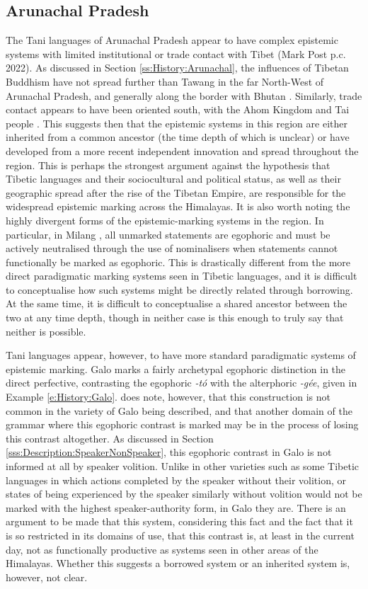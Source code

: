 \subsection{Arunachal Pradesh}
The Tani languages of Arunachal Pradesh appear to have complex epistemic systems with limited institutional or trade contact with Tibet (Mark Post p.c. 2022). As discussed in Section \ref{ss:History:Arunachal}, the influences of Tibetan Buddhism have not spread further than Tawang in the far North-West of Arunachal Pradesh, and generally along the border with Bhutan \cite{Namgyal2020}. Similarly, trade contact appears to have been oriented south, with the Ahom Kingdom and Tai people \cite{Nyori1993}. This suggests then that the epistemic systems in this region are either inherited from a common ancestor (the time depth of which is unclear) or have developed from a more recent independent innovation and spread throughout the region. This is perhaps the strongest argument against the hypothesis that Tibetic languages and their sociocultural and political status, as well as their geographic spread after the rise of the Tibetan Empire, are responsible for the widespread epistemic marking across the Himalayas. It is also worth noting the highly divergent forms of the epistemic-marking systems in the region. In particular, in Milang \cite[Siangic,][]{Modi2017}, all unmarked statements are egophoric and must be actively neutralised through the use of nominalisers when statements cannot functionally be marked as egophoric. This is drastically different from the more direct paradigmatic marking systems seen in Tibetic languages, and it is difficult to conceptualise how such systems might be directly related through borrowing. At the same time, it is difficult to conceptualise a shared ancestor between the two at any time depth, though in neither case is this enough to truly say that neither is possible.

Tani languages appear, however, to have more standard paradigmatic systems of epistemic marking. Galo marks a fairly archetypal egophoric distinction in the direct perfective, contrasting the egophoric \textit{-tó} with the alterphoric \textit{-gée}, given in Example \ref{e:History:Galo}.  does note, however, that this construction is not common in the variety of Galo being described, and that another domain of the grammar where this egophoric contrast is marked may be in the process of losing this contrast altogether. As discussed in Section \ref{sss:Description:SpeakerNonSpeaker}, this egophoric contrast in Galo is not informed at all by speaker volition. Unlike in other varieties such as some Tibetic languages in which actions completed by the speaker without their volition, or states of being experienced by the speaker similarly without volition would not be marked with the highest speaker-authority form, in Galo they are. There is an argument to be made that this system, considering this fact and the fact that it is so restricted in its domains of use, that this contrast is, at least in the current day, not as functionally productive as systems seen in other areas of the Himalayas. Whether this suggests a borrowed system or an inherited system is, however, not clear.

